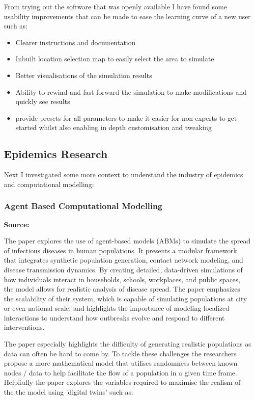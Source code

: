 From trying out the software that was openly available I have found some usability improvements that can be made to ease the learning curve of a new user such as:
\begin{itemize}
    \item Clearer instructions and documentation
    \item Inbuilt location selection map to easily select the area to simulate
    \item Better visualisations of the simulation results
    \item Ability to rewind and fast forward the simulation to make modifications and quickly see results
    \item provide presets for all parameters to make it easier for non-experts to get started whilst also enabling in depth customisation and tweaking
\end{itemize}

\subsection{Epidemics Research}
Next I investigated some more context to understand the industry of epidemics and computational modelling:
\subsubsection*{Agent Based Computational Modelling}{}
\textbf{Source:} \autocite{bissettAgentBasedComputationalEpidemiological2021}

The paper explores the use of agent-based models (ABMs) to simulate the spread of infectious diseases in human populations. It presents a modular framework that integrates synthetic population generation, contact network modeling, and disease transmission dynamics. By creating detailed, data-driven simulations of how individuals interact in households, schools, workplaces, and public spaces, the model allows for realistic analysis of disease spread. The paper emphasizes the scalability of their system, which is capable of simulating populations at city or even national scale, and highlights the importance of modeling localized interactions to understand how outbreaks evolve and respond to different interventions.

The paper especially highlights the difficulty of generating realistic populations as data can often be hard to come by. To tackle these challenges the researchers propose a more mathematical model that utilises randomness between known nodes / data to help facilitate the flow of a population in a given time frame. Helpfiully the paper explores the variables required to maximise the realism of the the model using 'digital twins' such as:


